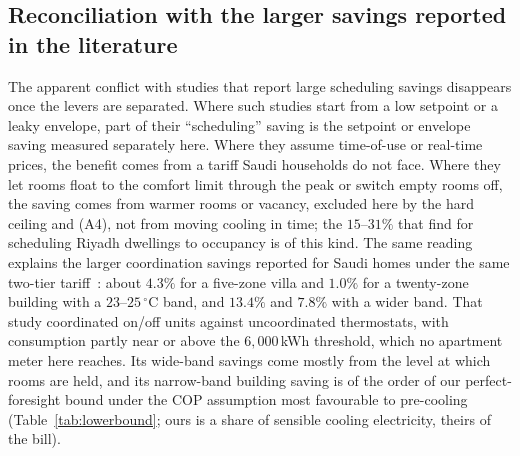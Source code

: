 \documentclass[10pt,a4paper,twocolumn]{article}
\theoremstyle{definition}
\begin{document}
\subsection{Reconciliation with the larger savings reported in the literature}
The apparent conflict with studies that report large scheduling savings disappears once the levers are separated. Where such studies start from a low setpoint or a leaky envelope, part of their ``scheduling'' saving is the setpoint or envelope saving measured separately here. Where they assume time-of-use or real-time prices, the benefit comes from a tariff Saudi households do not face. Where they let rooms float to the comfort limit through the peak or switch empty rooms off, the saving comes from warmer rooms or vacancy, excluded here by the hard ceiling and (A4), not from moving cooling in time; the $15$--$31\%$ that \citet{alshahrani2019smart} find for scheduling Riyadh dwellings to occupancy is of this kind. The same reading explains the larger coordination savings reported for Saudi homes under the same two-tier tariff~\citep{rl2026hvac}: about $4.3\%$ for a five-zone villa and $1.0\%$ for a twenty-zone building with a $23$--$25\,^{\circ}$C band, and $13.4\%$ and $7.8\%$ with a wider band. That study coordinated on/off units against uncoordinated thermostats, with consumption partly near or above the $6{,}000\,$kWh threshold, which no apartment meter here reaches. Its wide-band savings come mostly from the level at which rooms are held, and its narrow-band building saving is of the order of our perfect-foresight bound under the COP assumption most favourable to pre-cooling (Table~\ref{tab:lowerbound}; ours is a share of sensible cooling electricity, theirs of the bill).
\end{document}
